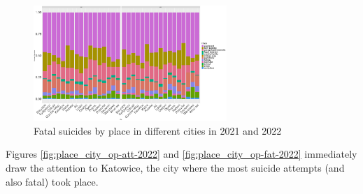 \documentclass{article}
\begin{document}
\begin{figure}[H]
    \centering
    \includegraphics[width=0.65\textwidth]{imgs/place_city_fat_suicides-2122.pdf}
    \caption{Fatal suicides by place in different cities in 2021 and 2022}
    \label{fig:place_city_fat_suicides-2122}
\end{figure}
%
Figures \ref{fig:place_city_op-att-2022} and \ref{fig:place_city_op-fat-2022}
immediately draw the attention to Katowice, the city where 
the most suicide attempts (and also fatal) took place.
%
\end{document}
